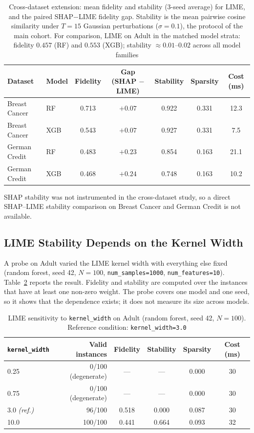 \documentclass[11pt,a4paper]{article}
\begin{document}
\begin{table}[!htb]
\centering
\caption{Cross-dataset extension: mean fidelity and stability (3-seed
average) for LIME, and the paired SHAP$-$LIME fidelity gap. Stability is
the mean pairwise cosine similarity under $T=15$ Gaussian perturbations
($\sigma=0.1$), the protocol of the main cohort. For comparison, LIME on
Adult in the matched model strata: fidelity $0.457$ (RF) and $0.553$ (XGB);
stability $\approx 0.01$--$0.02$ across all model families}
\label{tab:exp3_lime}
\begin{tabular}{llccccc}
\toprule
Dataset        & Model & Fidelity & Gap (SHAP $-$ LIME) & Stability & Sparsity & Cost (ms) \\
\midrule
Breast Cancer  & RF    & 0.713    & $+0.07$ & 0.922     & 0.331    & 12.3 \\
Breast Cancer  & XGB   & 0.543    & $+0.07$ & 0.927     & 0.331    & 7.5  \\
German Credit  & RF    & 0.483    & $+0.23$ & 0.854     & 0.163    & 21.1 \\
German Credit  & XGB   & 0.468    & $+0.24$ & 0.748     & 0.163    & 10.2 \\
\bottomrule
\end{tabular}
\end{table}

SHAP stability was not instrumented in the cross-dataset study, so a direct
SHAP--LIME stability comparison on Breast Cancer and German Credit is not
available.

\subsection{LIME Stability Depends on the Kernel Width}
\label{sec:kernel}

A probe on Adult varied the LIME kernel width with everything else fixed
(random forest, seed 42, $N=100$, \texttt{num\_samples=1000},
\texttt{num\_features=10}). Table~\ref{tab:kw} reports the result. Fidelity
and stability are computed over the instances that have at least one
non-zero weight. The probe covers one model and one seed, so it shows that
the dependence exists; it does not measure its size across models.

\begin{table}[htb]
\centering
\caption{LIME sensitivity to \texttt{kernel\_width} on Adult (random
forest, seed 42, $N=100$). Reference condition: \texttt{kernel\_width=3.0}}
\label{tab:kw}
\begin{tabular}{lrcccc}
\toprule
\texttt{kernel\_width} & Valid instances & Fidelity & Stability & Sparsity & Cost (ms) \\
\midrule
0.25  & 0/100 (degenerate) & ---   & ---   & 0.000 & 30 \\
0.75  & 0/100 (degenerate) & ---   & ---   & 0.000 & 30 \\
3.0 \emph{(ref.)} & 96/100 & 0.518 & 0.000 & 0.087 & 30 \\
10.0  & 100/100            & 0.441 & 0.664 & 0.093 & 32 \\
\bottomrule
\end{tabular}
\end{table}
\end{document}

